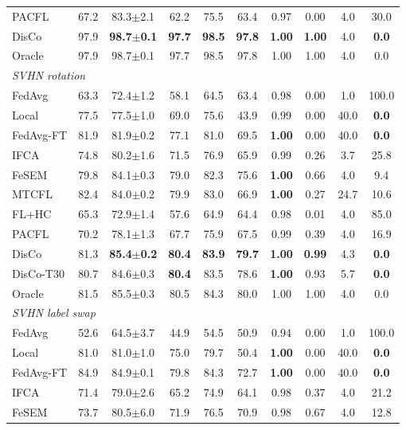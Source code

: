 \begin{tabular}{lccccccccc}
PACFL & 67.2 & 83.3$\pm$2.1 & 62.2 & 75.5 & 63.4 & 0.97 & 0.00 & 4.0 & 30.0 \\
DisCo & 97.9 & \textbf{98.7$\pm$0.1} & \textbf{97.7} & \textbf{98.5} & \textbf{97.8} & \textbf{1.00} & \textbf{1.00} & 4.0 & \textbf{0.0} \\
Oracle & 97.9 & 98.7$\pm$0.1 & 97.7 & 98.5 & 97.8 & 1.00 & 1.00 & 4.0 & 0.0 \\
\midrule
\multicolumn{10}{l}{\textit{SVHN rotation}}\\
FedAvg & 63.3 & 72.4$\pm$1.2 & 58.1 & 64.5 & 63.4 & 0.98 & 0.00 & 1.0 & 100.0 \\
Local & 77.5 & 77.5$\pm$1.0 & 69.0 & 75.6 & 43.9 & 0.99 & 0.00 & 40.0 & \textbf{0.0} \\
FedAvg-FT & 81.9 & 81.9$\pm$0.2 & 77.1 & 81.0 & 69.5 & \textbf{1.00} & 0.00 & 40.0 & \textbf{0.0} \\
IFCA & 74.8 & 80.2$\pm$1.6 & 71.5 & 76.9 & 65.9 & 0.99 & 0.26 & 3.7 & 25.8 \\
FeSEM & 79.8 & 84.1$\pm$0.3 & 79.0 & 82.3 & 75.6 & \textbf{1.00} & 0.66 & 4.0 & 9.4 \\
MTCFL & 82.4 & 84.0$\pm$0.2 & 79.9 & 83.0 & 66.9 & \textbf{1.00} & 0.27 & 24.7 & 10.6 \\
FL+HC & 65.3 & 72.9$\pm$1.4 & 57.6 & 64.9 & 64.4 & 0.98 & 0.01 & 4.0 & 85.0 \\
PACFL & 70.2 & 78.1$\pm$1.3 & 67.7 & 75.9 & 67.5 & 0.99 & 0.39 & 4.0 & 16.9 \\
DisCo & 81.3 & \textbf{85.4$\pm$0.2} & \textbf{80.4} & \textbf{83.9} & \textbf{79.7} & \textbf{1.00} & \textbf{0.99} & 4.3 & \textbf{0.0} \\
DisCo-T30 & 80.7 & 84.6$\pm$0.3 & \textbf{80.4} & 83.5 & 78.6 & \textbf{1.00} & 0.93 & 5.7 & \textbf{0.0} \\
Oracle & 81.5 & 85.5$\pm$0.3 & 80.5 & 84.3 & 80.0 & 1.00 & 1.00 & 4.0 & 0.0 \\
\midrule
\multicolumn{10}{l}{\textit{SVHN label swap}}\\
FedAvg & 52.6 & 64.5$\pm$3.7 & 44.9 & 54.5 & 50.9 & 0.94 & 0.00 & 1.0 & 100.0 \\
Local & 81.0 & 81.0$\pm$1.0 & 75.0 & 79.7 & 50.4 & \textbf{1.00} & 0.00 & 40.0 & \textbf{0.0} \\
FedAvg-FT & 84.9 & 84.9$\pm$0.1 & 79.8 & 84.3 & 72.7 & \textbf{1.00} & 0.00 & 40.0 & \textbf{0.0} \\
IFCA & 71.4 & 79.0$\pm$2.6 & 65.2 & 74.9 & 64.1 & 0.98 & 0.37 & 4.0 & 21.2 \\
FeSEM & 73.7 & 80.5$\pm$6.0 & 71.9 & 76.5 & 70.9 & 0.98 & 0.67 & 4.0 & 12.8 \\

\end{tabular}
